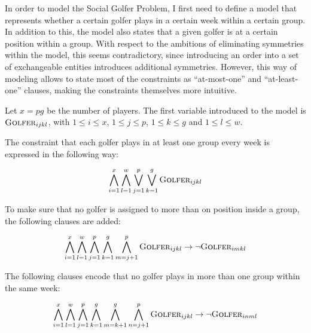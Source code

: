 \documentclass[a4paper]{scrartcl}
\begin{document}
In order to model the Social Golfer Problem, I first need to define a model that represents whether a certain golfer plays in a certain week within a certain group. In addition to this, the model also states that a given golfer is at a certain position within a group. With respect to the ambitions of eliminating symmetries within the model, this seems contradictory, since introducing an order into a set of exchangeable entities introduces additional symmetries. However, this way of modeling allows to state most of the constraints as ``at-most-one'' and ``at-least-one'' clauses, making the constraints themselves more intuitive.

Let $x = pg$ be the number of players. The first variable introduced to the model is $\textsc{Golfer}_{ijkl}$, with $1 \leq i \leq x$, $1 \leq j \leq p$, $1 \leq k \leq g$ and $1 \leq l \leq w$.

The constraint that each golfer plays in at least one group every week is expressed in the following way:

\begin{equation}
\label{form:everyone_plays}
\centering
    \bigwedge \limits_{i=1}^x 
    \bigwedge \limits_{l=1}^w 
    \bigvee \limits_{j=1}^p
    \bigvee \limits_{k=1}^g 
    \textsc{Golfer}_{ijkl}
\end{equation}

To make sure that no golfer is assigned to more than on position inside a group, the following clauses are added:

\begin{equation}
\centering
    \bigwedge \limits_{i=1}^x 
    \bigwedge \limits_{l=1}^w 
    \bigwedge \limits_{j=1}^p
    \bigwedge \limits_{k=1}^g 
    \bigwedge \limits_{m=j+1}^p 
    \textsc{Golfer}_{ijkl} 
    \to
    \neg \textsc{Golfer}_{imkl}
\end{equation}

The following clauses encode that no golfer plays in more than one group within the same week:

\begin{equation}
\centering
    \bigwedge \limits_{i=1}^x 
    \bigwedge \limits_{l=1}^w 
    \bigwedge \limits_{j=1}^p
    \bigwedge \limits_{k=1}^g 
    \bigwedge \limits_{m=k+1}^g 
    \bigwedge \limits_{n=j+1}^p 
    \textsc{Golfer}_{ijkl} 
    \to
    \neg \textsc{Golfer}_{inml}
\end{equation}
\end{document}
